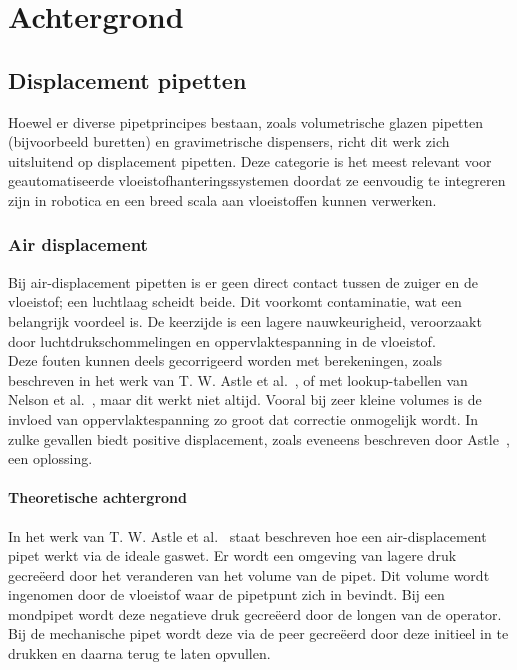 \chapter{Achtergrond}

\section{Displacement pipetten}
Hoewel er diverse pipetprincipes bestaan, zoals volumetrische glazen pipetten (bijvoorbeeld buretten) en gravimetrische dispensers, richt dit werk zich uitsluitend op displacement pipetten. Deze categorie is het meest relevant voor geautomatiseerde vloeistofhanteringssystemen doordat ze eenvoudig te integreren zijn in robotica en een breed scala aan vloeistoffen kunnen verwerken.

\subsection{Air displacement}
Bij air-displacement pipetten is er geen direct contact tussen de zuiger en de vloeistof; een luchtlaag scheidt beide. Dit voorkomt contaminatie, wat een belangrijk voordeel is. De keerzijde is een lagere nauwkeurigheid, veroorzaakt door luchtdrukschommelingen en oppervlaktespanning in de vloeistof.
\\[12pt]Deze fouten kunnen deels gecorrigeerd worden met berekeningen, zoals beschreven in het werk van T. W. Astle et al.\ \cite{RN15}, of met lookup-tabellen van Nelson et al.\ \cite{RN35}, maar dit werkt niet altijd. Vooral bij zeer kleine volumes is de invloed van oppervlaktespanning zo groot dat correctie onmogelijk wordt. In zulke gevallen biedt positive displacement, zoals eveneens beschreven door Astle\ \cite{RN15}, een oplossing.

\subsubsection{Theoretische achtergrond}
In het werk van T. W. Astle et al.\ \cite{RN15} staat beschreven hoe een air-displacement pipet werkt via de ideale gaswet. Er wordt een omgeving van lagere druk gecreëerd door het veranderen van het volume van de pipet. Dit volume wordt ingenomen door de vloeistof waar de pipetpunt zich in bevindt. Bij een mondpipet wordt deze negatieve druk gecreëerd door de longen van de operator. Bij de mechanische pipet wordt deze via de peer gecreëerd door deze initieel in te drukken en daarna terug te laten opvullen.

